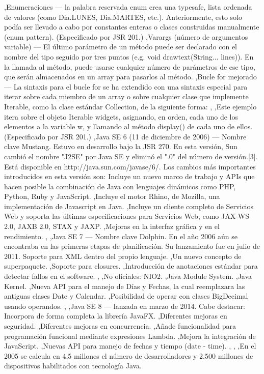 \documentclass[11pt,a4paper]{book}
\begin{document}
	\bigskip
							,Enumeraciones — la palabra reservada enum crea una typesafe, lista ordenada de valores (como Dia.LUNES, Dia.MARTES, etc.). Anteriormente, esto solo podía ser llevado a cabo por constantes enteras o clases construidas manualmente (enum pattern). (Especificado por JSR 201.)
	\bigskip
							,Varargs (número de argumentos variable) — El último parámetro de un método puede ser declarado con el nombre del tipo seguido por tres puntos (e.g. void drawtext(String... lines)). En la llamada al método, puede usarse cualquier número de parámetros de ese tipo, que serán almacenados en un array para pasarlos al método.
	\bigskip
							,Bucle for mejorado — La sintaxis para el bucle for se ha extendido con una sintaxis especial para iterar sobre cada miembro de un array o sobre cualquier clase que implemente Iterable, como la clase estándar Collection, de la siguiente forma:
	\bigskip
							,
	\bigskip
							,Este ejemplo itera sobre el objeto Iterable widgets, asignando, en orden, cada uno de los elementos a la variable w, y llamando al método display() de cada uno de ellos. (Especificado por JSR 201.)
	\bigskip
							,Java SE 6 (11 de diciembre de 2006) — Nombre clave Mustang. Estuvo en desarrollo bajo la JSR 270. En esta versión, Sun cambió el nombre "J2SE" por Java SE y eliminó el ".0" del número de versión.[3]. Está disponible en http://java.sun.com/javase/6/. Los cambios más importantes introducidos en esta versión son: Incluye un nuevo marco de trabajo y APIs que hacen posible la combinación de Java con lenguajes dinámicos como PHP, Python, Ruby y JavaScript.
	\bigskip
							,Incluye el motor Rhino, de Mozilla, una implementación de Javascript en Java.
	\bigskip
							,Incluye un cliente completo de Servicios Web y soporta las últimas especificaciones para Servicios Web, como JAX-WS 2.0, JAXB 2.0, STAX y JAXP.
	\bigskip
							,Mejoras en la interfaz gráfica y en el rendimiento.
	\bigskip
							,
	\bigskip
							,Java SE 7 — Nombre clave Dolphin. En el año 2006 aún se encontraba en las primeras etapas de planificación. Su lanzamiento fue en julio de 2011. Soporte para XML dentro del propio lenguaje.
	\bigskip
							,Un nuevo concepto de superpaquete.
	\bigskip
							,Soporte para closures.
	\bigskip
							,Introducción de anotaciones estándar para detectar fallos en el software.
	\bigskip
							,
	\bigskip
							,No oficiales: NIO2.
	\bigskip
							,Java Module System.
	\bigskip
							,Java Kernel.
	\bigskip
							,Nueva API para el manejo de Días y Fechas, la cual reemplazara las antiguas clases Date y Calendar.
	\bigskip
							,Posibilidad de operar con clases BigDecimal usando operandos.
	\bigskip
							,
	\bigskip
							,Java SE 8 — lanzada en marzo de 2014. Cabe destacar: Incorpora de forma completa la librería JavaFX.
	\bigskip
							,Diferentes mejoras en seguridad.
	\bigskip
							,Diferentes mejoras en concurrencia.
	\bigskip
							,Añade funcionalidad para programación funcional mediante expresiones Lambda.
	\bigskip
							,Mejora la integración de JavaScript.
	\bigskip
							,Nuevas API para manejo de fechas y tiempo (date - time).
	\bigskip
							,
	\bigskip
							,
	\bigskip
							,En el 2005 se calcula en 4,5 millones el número de desarrolladores y 2.500 millones de dispositivos habilitados con tecnología Java.
	\bigskip
			
\end{document}

